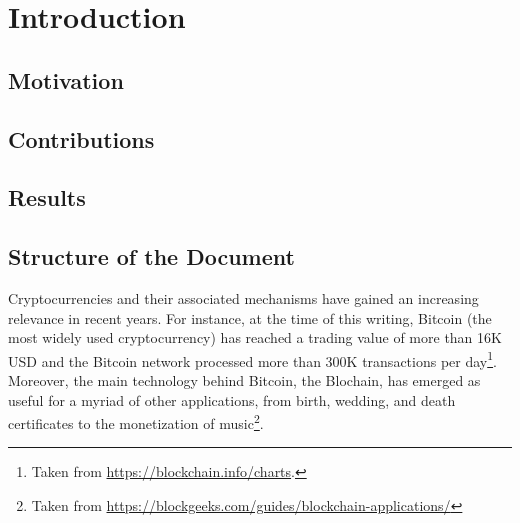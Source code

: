 \chapter{Introduction}
\section{Motivation}

\section{Contributions}

\section{Results}

\section{Structure of the Document}
Cryptocurrencies and their associated mechanisms have gained an increasing relevance in recent years. For instance, at the time of this writing, Bitcoin (the most widely used cryptocurrency) has reached a trading value of more than 16K USD and the Bitcoin network processed more than 300K transactions per day\footnote{Taken from \url{https://blockchain.info/charts}.}. Moreover, the main technology behind Bitcoin, the Blochain, has emerged as useful for a myriad of other applications, from birth, wedding, and death certificates to the monetization of music\footnote{Taken from \url{https://blockgeeks.com/guides/blockchain-applications/}}.

